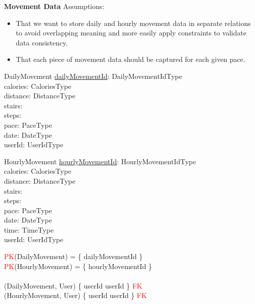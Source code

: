 \documentclass{article}
\begin{document}
\newline 
\textbf{Movement Data}
\newline \newline Assumptions:
\begin{itemize}
  \item That we want to store daily and hourly movement data in separate relations to avoid overlapping meaning and more easily apply constraints to validate data consistency.
  \item That each piece of movement data should be captured for each given pace.
\end{itemize}
\begin{schema}{DailyMovement}
    \underline{dailyMovementId}: DailyMovementIdType \\
    calories: CaloriesType \\
    distance: DistanceType \\ 
    stairs: \nat \\
    steps: \nat \\
    pace: PaceType \\
    date: DateType \\
    userId: UserIdType \\
\end{schema}
\begin{schema}{HourlyMovement}
    \underline{hourlyMovementId}: HourlyMovementIdType \\
    calories: CaloriesType \\
    distance: DistanceType \\ 
    stairs: \nat \\
    steps: \nat \\
    pace: PaceType \\
    date: DateType \\
    time: TimeType \\
    userId: UserIdType \\
\end{schema}
\begin{zed}
\textcolor{red}{PK}(DailyMovement) = \{ dailyMovementId \} \\
\textcolor{red}{PK}(HourlyMovement) = \{ hourlyMovementId \} \\
\newline \\ 
(DailyMovement, User) \mapsto \{ userId \mapsto userId \} \in \textcolor{red}{FK} \\
(HourlyMovement, User) \mapsto \{ userId \mapsto userId \} \in \textcolor{red}{FK} \\
\end{zed}
\end{document}
